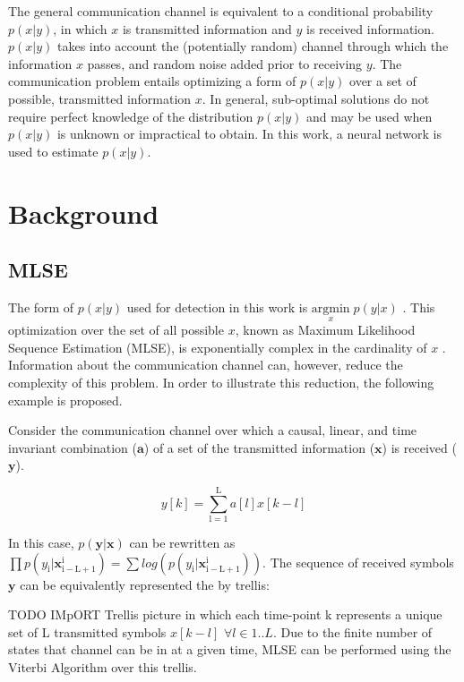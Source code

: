 \documentclass[12pt,a4paper]{report}
\begin{document}
The general communication channel is equivalent to a conditional probability $p(x|y)$, in which $x$ is transmitted information and $y$ is received information.  $p(x|y)$ takes into account the (potentially random) channel through which the information $x$ passes, and random noise added prior to receiving $y$. The communication problem entails optimizing a form of $p(x|y)$ over a set of possible, transmitted information $x$. In general, sub-optimal solutions do not require perfect knowledge of the distribution $p(x|y)$ and may be used when $p(x|y)$ is unknown or impractical to obtain. In this work, a neural network is used to estimate $p(x|y)$.

\section{Background}

\subsection{MLSE}
The form of $p(x|y)$ used for detection in this work is
$\underset{x}{\text{argmin}} \; p(y|x) $ . This optimization over the set of all possible $x$, known as Maximum Likelihood Sequence Estimation (MLSE), is exponentially complex in the cardinality of $x$ . Information about the communication channel can, however, reduce the complexity of this problem. In order to illustrate this reduction, the following example is proposed.
\par
Consider the communication channel over which a causal, linear, and time invariant combination ($\mathbf{a}$) of a set of the transmitted information ($\mathbf{x}$) is received ($\mathbf{y}$). 

\begin{equation}
y[k] = \sum_{\mathrm{l=1}}^{\mathrm{L}} a[l]x[k-l]
\end{equation}

In this case, $p(\mathbf{y}|\mathbf{x})$ can be rewritten as
$\prod p(y_{\mathrm{i}}|\mathbf{x}_{\mathrm{i-L+1}}^{\mathrm{i}}) = \sum
log(p(y_{\mathrm{i}}|\mathbf{x}_{\mathrm{i-L+1}}^{\mathrm{i}}) )$.
The sequence of received symbols $\mathbf{y}$ can be equivalently represented the by trellis:

TODO IMpORT Trellis picture
in which each time-point k represents a unique set of L transmitted symbols 
$x[k-l]$ $ \forall l \in {1..L}$. Due to the finite number of states that channel can be in at a given time, MLSE can be performed using the Viterbi Algorithm over this trellis. 
\end{document}
